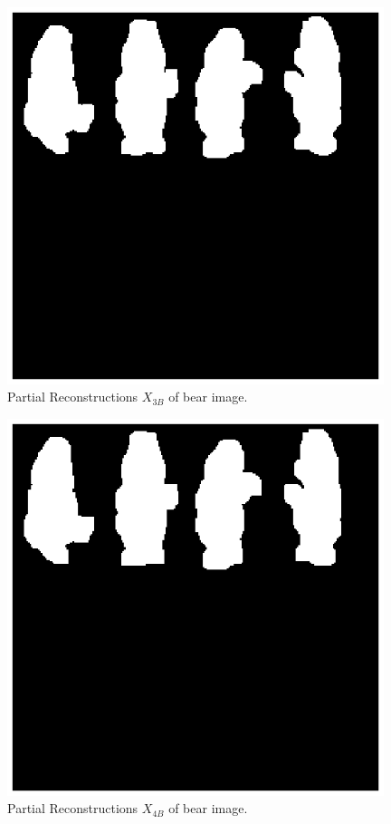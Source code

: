 \documentclass[paper=a4, fontsize=11pt]{scrartcl}
\begin{document}
\begin{figure}
	\centering
	\includegraphics[width=11cm]{X3Bbear.eps}
	\caption{Partial Reconstructions $X_{3B}$ of bear image.}
	\label{fig:10}
\end{figure}

\begin{figure}
	\centering
	\includegraphics[width=11cm]{X4Bbear.eps}
	\caption{Partial Reconstructions $X_{4B}$ of bear image.}
	\label{fig:11}
\end{figure}
\end{document}
